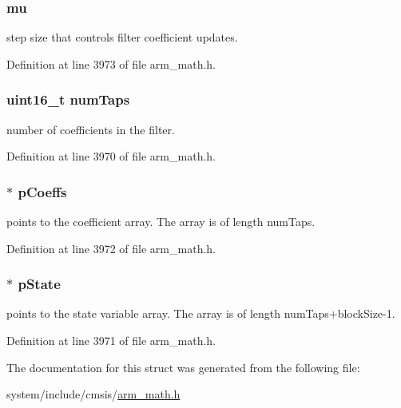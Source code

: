 \subsubsection[{\texorpdfstring{mu}{mu}}]{ mu}\hypertarget{structarm__lms__instance__f32_a11402afa7c9b9dac4cb953fa386e74d2}{}\label{structarm__lms__instance__f32_a11402afa7c9b9dac4cb953fa386e74d2}
step size that controls filter coefficient updates. 

Definition at line 3973 of file arm\+\_\+math.\+h.

\subsubsection[{\texorpdfstring{num\+Taps}{numTaps}}]{\setlength{\rightskip}{0pt plus 5cm}uint16\+\_\+t num\+Taps}\hypertarget{structarm__lms__instance__f32_a751941891e47f522a7f5375fe8990aac}{}\label{structarm__lms__instance__f32_a751941891e47f522a7f5375fe8990aac}
number of coefficients in the filter. 

Definition at line 3970 of file arm\+\_\+math.\+h.

\subsubsection[{\texorpdfstring{p\+Coeffs}{pCoeffs}}]{$\ast$ p\+Coeffs}\hypertarget{structarm__lms__instance__f32_aacbb8dd8eeba4b21fc2bb40076405ee3}{}\label{structarm__lms__instance__f32_aacbb8dd8eeba4b21fc2bb40076405ee3}
points to the coefficient array. The array is of length num\+Taps. 

Definition at line 3972 of file arm\+\_\+math.\+h.

\subsubsection[{\texorpdfstring{p\+State}{pState}}]{$\ast$ p\+State}\hypertarget{structarm__lms__instance__f32_a335c87e6fdc4b96601d95a5de8b9c463}{}\label{structarm__lms__instance__f32_a335c87e6fdc4b96601d95a5de8b9c463}
points to the state variable array. The array is of length num\+Taps+block\+Size-\/1. 

Definition at line 3971 of file arm\+\_\+math.\+h.



The documentation for this struct was generated from the following file\+:\begin{DoxyCompactItemize}
\item 
system/include/cmsis/\hyperlink{arm__math_8h}{arm\+\_\+math.\+h}\end{DoxyCompactItemize}
